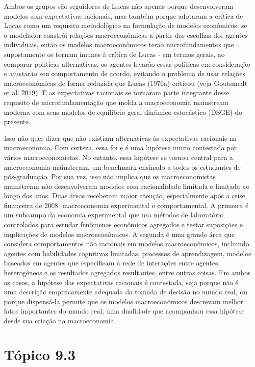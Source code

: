 \documentclass[12pt]{article}
\begin{document}
Ambos os grupos são seguidores de Lucas não apenas porque desenvolveram modelos com expectativas racionais, mas também porque adotaram a crítica de Lucas como um requisito metodológico na formulação de modelos econômicos: se o modelador constrói relações macroeconômicas a partir das escolhas dos agentes individuais, então os modelos macroeconômicos terão microfundamentos que supostamente os tornam imunes à crítica de Lucas - em termos gerais, ao comparar políticas alternativas, os agentes levarão essas políticas em consideração e ajustarão seu comportamento de acordo, evitando o problema de usar relações macroeconômicas de forma reduzida que Lucas (1976a) criticou (veja Goutsmedt et al. 2019). E as expectativas racionais se tornaram parte integrante desse requisito de microfundamentação que molda a macroeconomia mainstream moderna com seus modelos de equilíbrio geral dinâmico estocástico (DSGE) do presente.

Isso não quer dizer que não existiam alternativas às expectativas racionais na macroeconomia. Com certeza, essa foi e é uma hipótese muito contestada por vários macroeconomistas. No entanto, essa hipótese se tornou central para a macroeconomia mainstream, um benchmark ensinado a todos os estudantes de pós-graduação. Por sua vez, isso não implica que os macroeconomistas mainstream não desenvolveram modelos com racionalidade limitada e limitada ao longo dos anos. Duas áreas receberam maior atenção, especialmente após a crise financeira de 2008: macroeconomia experimental e comportamental. A primeira é um subcampo da economia experimental que usa métodos de laboratório controlados para estudar fenômenos econômicos agregados e testar suposições e implicações de modelos macroeconômicos. A segunda é uma grande área que considera comportamentos não racionais em modelos macroeconômicos, incluindo agentes com habilidades cognitivas limitadas, processos de aprendizagem, modelos baseados em agentes que especificam a rede de interações entre agentes heterogêneos e os resultados agregados resultantes, entre outras coisas. Em ambos os casos, a hipótese das expectativas racionais é contestada, seja porque não é uma descrição empiricamente adequada da tomada de decisão no mundo real, ou porque dispensá-la permite que os modelos macroeconômicos descrevam melhor fatos importantes do mundo real, uma dualidade que acompanhou essa hipótese desde sua criação na macroeconomia.

\newpage
\section*{\textbf{Tópico 9.3}}
\end{document}
